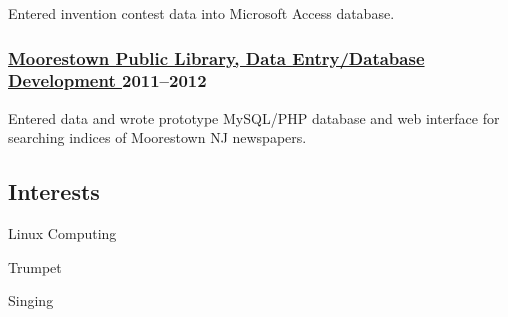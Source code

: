 \documentclass[lettersize,12pt,]{article}
\begin{document}
\begin{compactitem}
\itemsep1pt\parskip0pt

\item Entered invention contest data into Microsoft Access database.

\end{compactitem}



\subsubsection{ \href{ http://www.moorestown.lib.nj.us/ }{ Moorestown Public Library, Data Entry/Database Development }\hfill 2011--2012 }



\begin{compactitem}
\itemsep1pt\parskip0pt

\item Entered data and wrote prototype MySQL/PHP database and web interface for searching indices of Moorestown NJ newspapers.

\end{compactitem}





\subsection{Interests}\label{interests}
\begin{compactitem}

\item Linux Computing 

\item Trumpet 

\item Singing 

\end{compactitem}
\end{document}
